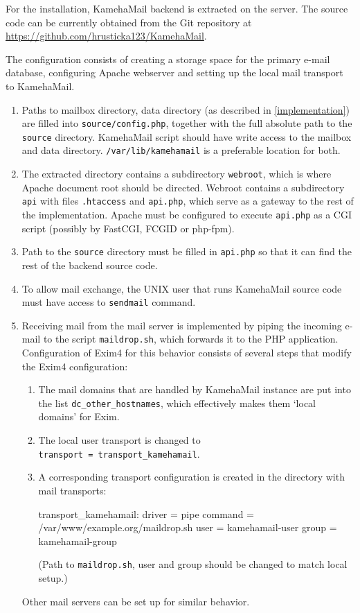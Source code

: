 For the installation, KamehaMail backend is extracted on the server. The source code can be currently obtained from the Git repository at \url{https://github.com/hrusticka123/KamehaMail}.

The configuration consists of creating a storage space for the primary e-mail database, configuring Apache webserver and setting up the local mail transport to KamehaMail.

\begin{enumerate}
\item Paths to mailbox directory, data directory (as described in \autoref{implementation}) are filled into \texttt{source/config.php}, together with the full absolute path to the \texttt{source} directory. KamehaMail script should have write access to the mailbox and data directory. \texttt{/var/lib/kamehamail} is a preferable location for both.
\item The extracted directory contains a subdirectory \texttt{webroot}, which is where Apache document root should be directed. Webroot contains a subdirectory \texttt{api} with files \texttt{.htaccess} and \texttt{api.php}, which serve as a gateway to the rest of the implementation. Apache must be configured to execute \texttt{api.php} as a CGI script (possibly by FastCGI, FCGID or php-fpm).
\item Path to the \texttt{source} directory must be filled in \texttt{api.php} so that it can find the rest of the backend source code.
\item To allow mail exchange, the UNIX user that runs KamehaMail source code must have access to \texttt{sendmail} command.
\item Receiving mail from the mail server is implemented by piping the incoming e-mail to the script \texttt{maildrop.sh}, which forwards it to the PHP application. Configuration of Exim4 for this behavior consists of several steps that modify the Exim4 configuration:
\begin{enumerate}
\item The mail domains that are handled by KamehaMail instance are put into the list \texttt{dc\_other\_hostnames}, which effectively makes them `local domains' for Exim.
\item The local user transport is changed to\\ \texttt{transport = transport\_kamehamail}.
\item A corresponding transport configuration is created in the directory with mail transports:
\begin{code}
transport_kamehamail:
	driver = pipe
	command = /var/www/example.org/maildrop.sh
	user = kamehamail-user
	group = kamehamail-group
\end{code}
(Path to \texttt{maildrop.sh}, user and group should be changed to match local setup.)
\end{enumerate}
Other mail servers can be set up for similar behavior.
\end{enumerate}

